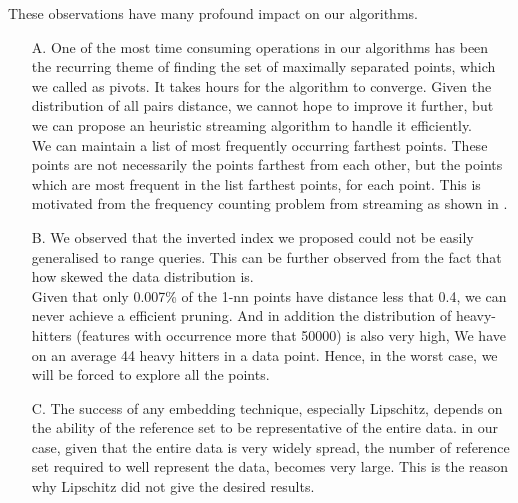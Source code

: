 These observations have many profound impact on our algorithms.
\begin{enumerate}

\item[A.] {One of the most time consuming operations in our algorithms has been the recurring theme of finding the set of maximally separated points, which we called as pivots. It takes hours for the algorithm to converge. Given the distribution of all pairs distance, we cannot hope to improve it further, but we can propose an heuristic streaming algorithm to handle it efficiently.\\ 
	We can maintain a list of most frequently occurring farthest points. These points are not necessarily the points farthest from each other, but the points which are most frequent in the list farthest points, for each point. This is motivated from the frequency counting problem from streaming as shown in \citet*{metwally2005efficient}.}\\

\item[B.] {We observed that the inverted index we proposed could not be easily generalised  to range queries. This can be further observed from the fact that how skewed the data distribution is.\\ 
	Given that only 0.007\% of the 1-nn points have distance less that 0.4, we can never achieve a efficient pruning. And in addition the distribution of heavy-hitters (features with occurrence more that 50000) is also very high, We have on an average 44 heavy hitters in a data point. Hence, in the worst case, we will be forced to explore all the points.} \\

\item[C.] {The success of any embedding technique, especially Lipschitz, depends on the ability of the reference set to be representative of the entire data. in our case, given that the entire data is very widely spread, the number of reference set required to well represent the data, becomes very large. This is the reason why Lipschitz did not give the desired results.}
\end{enumerate}
